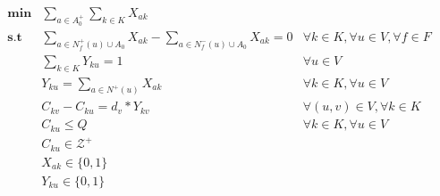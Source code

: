 \begin{align*}
    \mathbf{min} &\sum_{a\in A_0^+} \sum_{k \in K} {X_{ak}} \\
   \mathbf{s.t} &\sum_{a\in N_f^+(u) \cup A_0}{X_{ak}} - \sum_{a\in N_f^-(u) \cup A_0}{X_{ak}} = 0 & \forall k \in K, \forall u \in V, \forall f \in F \\
        &\sum_{k \in K}{Y_{ku}=1} & \forall u \in V\\
        &Y_{ku} = \sum_{a\in N^+(u)}{X_{ak}} & \forall k \in K, \forall u \in V\\
        &C_{kv} - C_{ku} = d_v * Y_{kv} & \forall (u,v) \in V, \forall k \in K\\
        &C_{ku} \leq Q & \forall k \in K, \forall u \in V \\
        &C_{ku} \in \mathcal{Z^+} \\
        &X_{ak} \in \{0,1\} \\
        &Y_{ku} \in \{0,1\}
\end{align*}